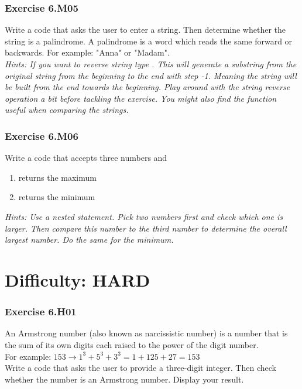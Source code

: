 
\subsubsection*{Exercise 6.M05}
Write a code that asks the user to enter a string. Then determine whether the string is a
palindrome. A palindrome is a word which reads the same forward or backwards. For example: "Anna" or "Madam".\\


\textit{Hints:
If you want to reverse string {} type {}. This will generate a substring from the original string from the beginning to the end with step -1. Meaning the string will be built from the end towards the beginning. Play around with the string reverse operation a bit before tackling the exercise. You might also find the {} function useful when comparing the strings.}\\[1cm]



\subsubsection*{Exercise 6.M06}
Write a code that accepts three numbers and
\begin{enumerate}[label=(\alph*)]
	\item returns the maximum
	\item returns the minimum
\end{enumerate}


\textit{Hints:
Use a nested {} statement. Pick two numbers first and check which one is larger. Then compare this number to the third number to determine the overall largest number. Do the
same for the minimum.}



\newpage
\section{Difficulty: HARD}

\subsubsection*{Exercise 6.H01}
An Armstrong number (also known as narcissistic number) is a number that is the sum of its
own digits each raised to the power of the digit number.\\
For example: $153 \rightarrow 1^3 + 5^3 + 3^3 = 1 + 125 + 27 = 153$\\
Write a code that asks the user to provide a three-digit integer. Then check whether the
number is an Armstrong number. Display your result.\\


